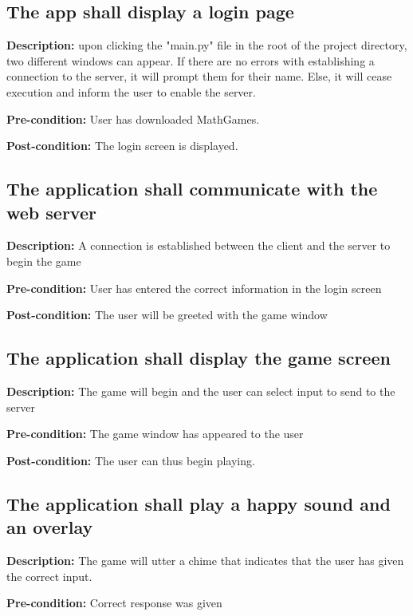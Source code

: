 \documentclass[12pt]{article}
\begin{document}
\begin{flushleft}

\subsection{The app shall display a login page}

\textbf{Description:} upon clicking the "main.py" file in the root of the project directory, two different windows can appear. If there are no errors with establishing a connection to the server, it will prompt them for their name. Else, it will cease execution and inform the user to enable the server.

\textbf{Pre-condition:} User has downloaded MathGames.

\textbf{Post-condition:} The login screen is displayed.


\subsection{The application shall communicate with the web server}

\textbf{Description:} A connection is established between the client and the server to begin the game

\textbf{Pre-condition:} User has entered the correct information in the login screen

\textbf{Post-condition:} The user will be greeted with the game window

\subsection{The application shall display the game screen}

\textbf{Description:} The game will begin and the user can select input to send to the server

\textbf{Pre-condition:} The game window has appeared to the user

\textbf{Post-condition:} The user can thus begin playing.

\subsection{The application shall play a happy sound and an overlay}

\textbf{Description:} The game will utter a chime that indicates that the user has given the correct input.

\textbf{Pre-condition:} Correct response was given


\end{flushleft}
\end{document}
